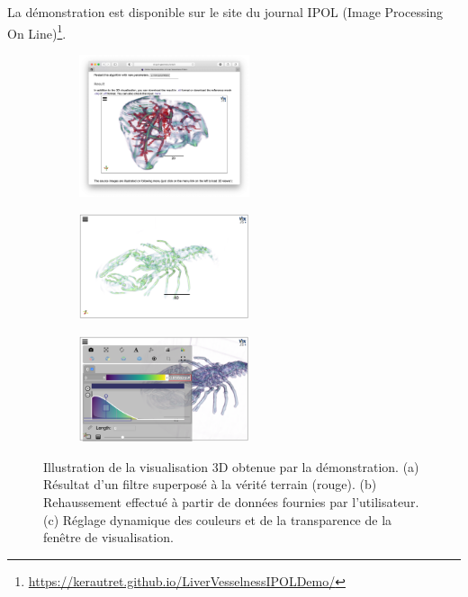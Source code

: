 La démonstration est disponible sur le site du journal IPOL (Image Processing On Line)\footnote{\url{ https://kerautret.github.io/LiverVesselnessIPOLDemo/}}. 
\begin{figure}[!ht]
\noindent   
\centering
    \begin{subfigure}{0.33\textwidth}
        \centering
        \includegraphics[width=5cm, trim= 4.7cm 5cm 4.7cm 8.5cm, clip=true]{Images/visuDemoViewer.png}
        \caption{ }
    \end{subfigure}
    \begin{subfigure}{0.33\textwidth}
        \centering
        \includegraphics[width=5cm]{Images/visuDemoViewerExtract.png}
        \caption{ }
    \end{subfigure}
    \begin{subfigure}{0.33\textwidth}
        \centering
        \includegraphics[width=5cm]{Images/visuDemoViewerExtract2.png}
        \caption{ }
    \end{subfigure}
  \caption{Illustration de la visualisation 3D obtenue par la démonstration. (a) Résultat d'un filtre superposé à la vérité terrain (rouge). (b) Rehaussement effectué à partir de données fournies par l'utilisateur. (c) Réglage dynamique des couleurs et de la transparence de la fenêtre de visualisation.}
\label{fig:Illustr3D}
\end{figure}
